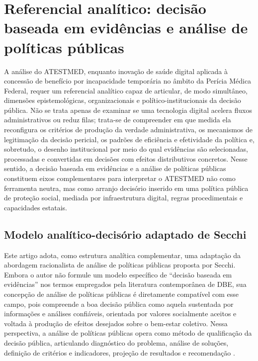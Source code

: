 \documentclass[12pt,a4paper]{article}
\begin{document}
\section{Referencial analítico: decisão baseada em evidências e análise de políticas públicas}
\label{sec:org6a991e9}
A análise do ATESTMED, enquanto inovação de saúde digital aplicada à concessão de benefício por incapacidade temporária no âmbito da Perícia Médica Federal, requer um referencial analítico capaz de articular, de modo simultâneo, dimensões epistemológicas, organizacionais e político-institucionais da decisão pública. Não se trata apenas de examinar se uma tecnologia digital acelera fluxos administrativos ou reduz filas; trata-se de compreender em que medida ela reconfigura os critérios de produção da verdade administrativa, os mecanismos de legitimação da decisão pericial, os padrões de eficiência e efetividade da política e, sobretudo, o desenho institucional por meio do qual evidências são selecionadas, processadas e convertidas em decisões com efeitos distributivos concretos. Nesse sentido, a decisão baseada em evidências e a análise de políticas públicas constituem eixos complementares para interpretar o ATESTMED não como ferramenta neutra, mas como arranjo decisório inserido em uma política pública de proteção social, mediada por infraestrutura digital, regras procedimentais e capacidades estatais.

\subsection{Modelo analítico-decisório adaptado de Secchi}
\label{sec:org6f43b3d}

Este artigo adota, como estrutura analítica complementar, uma adaptação da abordagem racionalista de análise de políticas públicas proposta por Secchi. Embora o autor não formule um modelo específico de “decisão baseada em evidências” nos termos empregados pela literatura contemporânea de DBE, sua concepção de análise de políticas públicas é diretamente compatível com esse campo, pois compreende a boa decisão pública como aquela sustentada por informações e análises confiáveis, orientada por valores socialmente aceitos e voltada à produção de efeitos desejados sobre o bem-estar coletivo. Nessa perspectiva, a análise de políticas públicas opera como método de qualificação da decisão pública, articulando diagnóstico do problema, análise de soluções, definição de critérios e indicadores, projeção de resultados e recomendação \parencite{secchi2020analisedepoliticaspublicas}.
\end{document}
